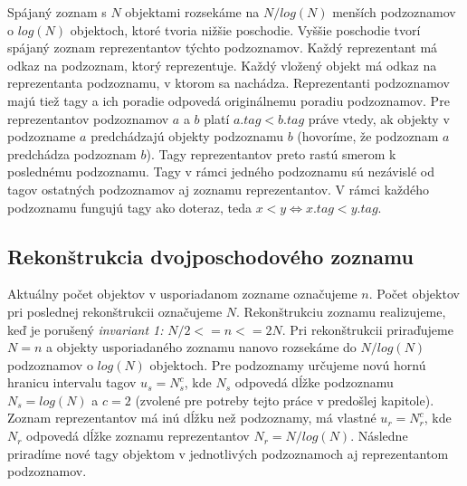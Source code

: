 \documentclass[
  digital,     %
  oneside,     %
  nosansbold,  %
  nocolorbold, %
  lof,         %
  lot,         %
]{fithesis4}
\begin{document}
Spájaný zoznam s $N$ objektami rozsekáme na $N/log(N)$ menších podzoznamov o $log(N)$ objektoch, ktoré tvoria nižšie poschodie. Vyššie poschodie tvorí spájaný zoznam reprezentantov týchto podzoznamov. Každý reprezentant má odkaz na podzoznam, ktorý reprezentuje. Každý vložený objekt má odkaz na reprezentanta podzoznamu, v ktorom sa nachádza. Reprezentanti podzoznamov majú tiež tagy a ich poradie odpovedá originálnemu poradiu podzoznamov. Pre reprezentantov podzoznamov $a$ a $b$ platí $a.tag < b.tag$ práve vtedy, ak objekty v podzozname $a$ predchádzajú objekty podzoznamu $b$ (hovoríme, že podzoznam $a$ predchádza podzoznam $b$). Tagy reprezentantov preto rastú smerom k poslednému podzoznamu. Tagy v rámci jedného podzoznamu sú nezávislé od tagov ostatných podzoznamov aj zoznamu reprezentantov. V rámci každého podzoznamu fungujú tagy ako doteraz, teda $x < y \iff x.tag < y.tag$. 

\subsection{Rekonštrukcia dvojposchodového zoznamu}

Aktuálny počet objektov v usporiadanom zozname označujeme $n$. Počet objektov pri poslednej rekonštrukcii označujeme $N$. Rekonštrukciu zoznamu realizujeme, keď je porušený \textit{invariant 1:} $N/2 <= n <= 2N$.
Pri rekonštrukcii priraďujeme $N = n$ a objekty usporiadaného zoznamu nanovo rozsekáme do $N/log(N)$ podzoznamov o $log(N)$ objektoch. Pre podzoznamy určujeme novú hornú hranicu intervalu tagov $u_s = N_s^c$, kde $N_s$ odpovedá dĺžke podzoznamu $N_s = log(N)$ a $c = 2$ (zvolené pre potreby tejto práce v predošlej kapitole). Zoznam reprezentantov má inú dĺžku než podzoznamy, má vlastné $u_r = N_r^c$, kde $N_r$ odpovedá dĺžke zoznamu reprezentantov $N_r = N/log(N)$. Následne priradíme nové tagy objektom v jednotlivých podzoznamoch aj reprezentantom podzoznamov.
\end{document}

